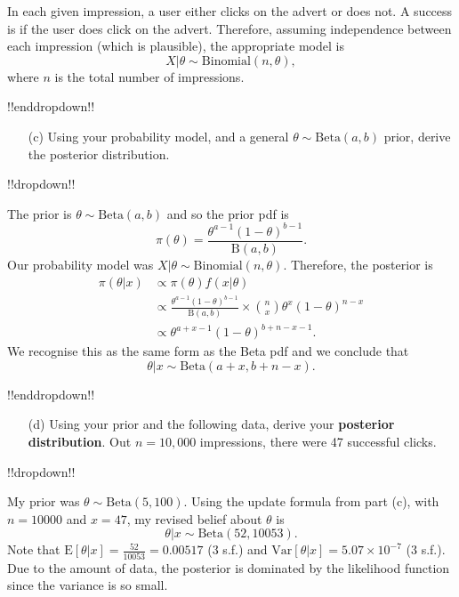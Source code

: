 {In each given impression, a user either clicks on the advert or does not. A success is if the user does click on the advert. Therefore, assuming independence between each impression (which is plausible), the appropriate model is
    $$ X|\theta \sim \mathrm{Binomial}(n, \theta), $$
    where $n$ is the total number of impressions.

!!enddropdown!!

\clearpage

\begin{itemize}
\item [(c)] Using your probability model, and a general $\theta \sim \mathrm{Beta}(a,b)$ prior, derive the posterior distribution.
\end{itemize}
!!dropdown!!

The prior is $\theta\sim \mathrm{Beta}(a,b)$ and so the prior pdf is
    $$ \pi(\theta) = \frac{\theta^{a-1}(1-\theta)^{b-1}}{\mathrm{B}(a,b)}.$$
    Our probability model was $X|\theta \sim \mathrm{Binomial}(n, \theta)$. Therefore, the posterior is
    \begin{align*}
        \pi(\theta|x) &\propto \pi(\theta) f(x|\theta) \\
        &\propto \frac{\theta^{a-1}(1-\theta)^{b-1}}{\mathrm{B}(a,b)} \times \binom{n}{x} \theta^{x}(1-\theta)^{n-x} \\
        &\propto \theta^{a + x - 1} (1-\theta)^{b + n - x - 1}.
    \end{align*}
    We recognise this as the same form as the Beta pdf and we conclude that $$\theta | x \sim \mathrm{Beta}(a + x, b + n - x).$$

!!enddropdown!!

\begin{itemize}
\item [(d)] Using your prior and the following data, derive your \textbf{\color{darkblue}posterior distribution}. Out $n=10,000$ impressions, there were 47 successful clicks.
\end{itemize}
!!dropdown!!

My prior was $\theta \sim \mathrm{Beta}(5, 100)$. Using the update formula from part (c), with $n = 10000$ and $x = 47$, my revised belief about $\theta$ is
    $$ \theta | x \sim \mathrm{Beta}(52, 10053). $$
    Note that $\text{E}[\theta|x] = \frac{52}{10053} = 0.00517$ (3 s.f.) and $\text{Var}[\theta|x] = 5.07\times 10^{-7}$ (3 s.f.). Due to the amount of data, the posterior is dominated by the likelihood function since the variance is so small.

}
